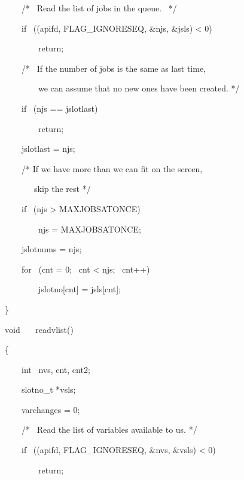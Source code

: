 \begin{exparasmall}
\ \ \ \ /* \ Read the list of jobs in the queue. \ */

\bigskip


\ \ \ \ if \ (\funcnameXBjoblist{}(apifd, \constprefix{}FLAG\_IGNORESEQ, \&njs, \&jsls)
{\textless} 0)

\ \ \ \ \ \ \ \ return;

\bigskip


\ \ \ \ /* \ If the number of jobs is the same as last time,

\ \ \ \ \ \ \ \ we can assume that no new ones have been created. */

\bigskip


\ \ \ \ if \ (njs == jslotlast)

\ \ \ \ \ \ \ \ return;

\bigskip


\ \ \ \ jslotlast = njs;

\bigskip


\ \ \ \ /* If we have more than we can fit on the screen,

\ \ \ \ \ \ \ skip the rest */

\bigskip


\ \ \ \ if \ (njs {\textgreater} MAXJOBSATONCE)

\ \ \ \ \ \ \ \ njs = MAXJOBSATONCE;

\bigskip


\ \ \ \ jslotnums = njs;

\bigskip


\ \ \ \ for \ (cnt = 0; \ cnt {\textless} njs; \ cnt++)

\ \ \ \ \ \ \ \ jslotno[cnt] = jsls[cnt];

\}

\bigskip


void \ \ \ readvlist()

\{

\ \ \ \ int \ nvs, cnt, cnt2;

\ \ \ \ slotno\_t *vsls;

\bigskip


\ \ \ \ varchanges = 0;

\bigskip


\ \ \ \ /* \ Read the list of variables available to us. */

\bigskip


\ \ \ \ if \ (\funcnameXBvarlist{}(apifd, \constprefix{}FLAG\_IGNORESEQ, \&nvs, \&vsls)
{\textless} 0)

\ \ \ \ \ \ \ \ return;

\bigskip



\end{exparasmall}
